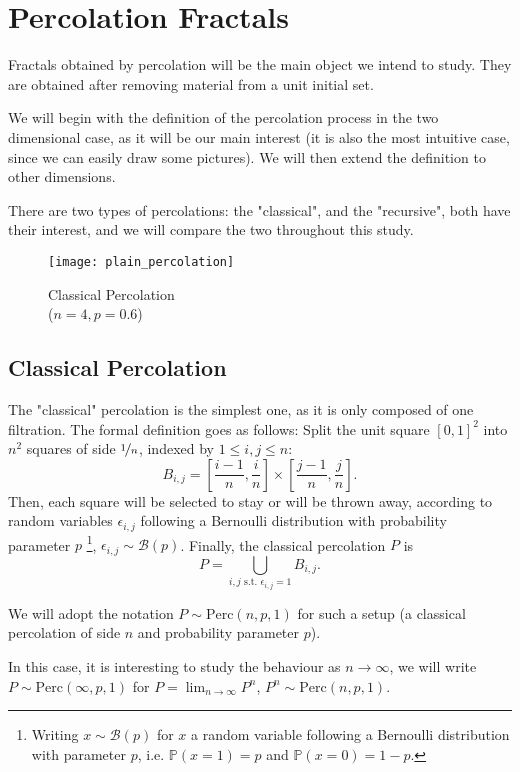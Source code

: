 \section{Percolation Fractals}
Fractals obtained by percolation will be the main object we intend to study. They are obtained after removing material from a unit initial set.

We will begin with the definition of the percolation process in the two dimensional case, as it will be our main interest (it is also the most intuitive case, since we can easily draw some pictures).
We will then extend the definition to other dimensions.

There are two types of percolations: the "classical", and the "recursive", both have their interest, and we will compare the two throughout this study.

\begin{wrapfigure}{r}{6.5cm}
	\vspace{-1.2cm}
	\centering
	\texttt{[image: plain\_percolation]}
	\caption{Classical Percolation\\($n=4, p=0.6$)}
	\label{fig:classicalPercolation}
\end{wrapfigure}
\subsection{Classical Percolation}
The "classical" percolation is the simplest one, as it is only composed of one filtration.
The formal definition goes as follows:
Split the unit square $\left[ 0,1 \right]^2$ into $n^2$ squares of side $\nicefrac{1}{n}$, indexed by $1 \leq i,j \leq n$:
$$B_{i,j} = \left[ \frac{i-1}{n}, \frac{i}{n} \right] \times \left[ \frac{j-1}{n}, \frac{j}{n} \right].$$
Then, each square will be selected to stay or will be thrown away, according to random variables $\epsilon_{i,j}$ following a Bernoulli distribution with probability parameter $p$
\footnote{Writing $x \sim \mathcal{B}(p)$ for $x$ a random variable following a Bernoulli distribution with parameter $p$, i.e. $\mathbb{P}(x=1)=p$ and $\mathbb{P}(x=0)=1-p$.},
$\epsilon_{i,j} \sim \mathcal{B}(p)$.
Finally, the classical percolation $P$ is
$$P = \bigcup_{i,j \text{ s.t. } \epsilon_{i,j}=1} B_{i,j}.$$

We will adopt the notation $P \sim \text{Perc}(n,p,1)$ for such a setup (a classical percolation of side $n$ and probability parameter $p$).

In this case, it is interesting to study the behaviour as $n \to \infty$, we will write $P \sim \text{Perc}(\infty,p,1)$ for $P = \lim_{n \to \infty} P^n$, $P^n \sim \text{Perc}(n,p,1)$.

